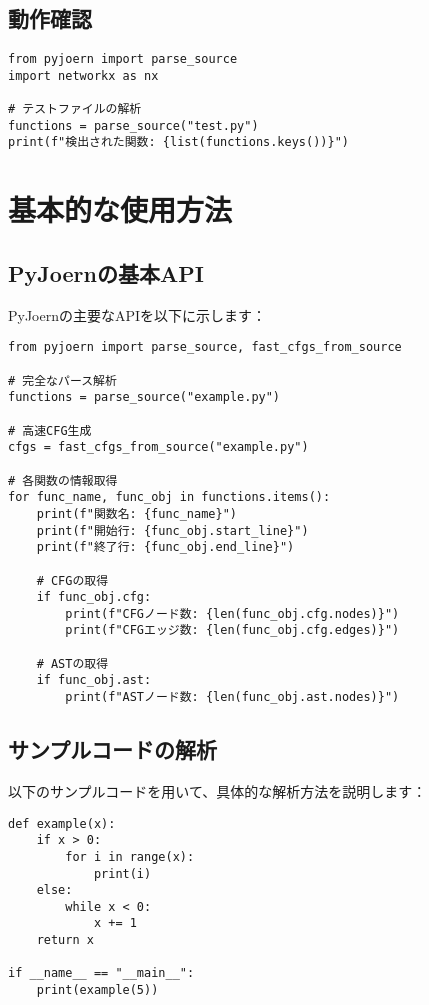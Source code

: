 \documentclass[12pt,a4paper]{article}
\begin{document}
\subsection{動作確認}

\begin{lstlisting}[caption=基本的な動作確認]
from pyjoern import parse_source
import networkx as nx

# テストファイルの解析
functions = parse_source("test.py")
print(f"検出された関数: {list(functions.keys())}")
\end{lstlisting}

\section{基本的な使用方法}

\subsection{PyJoernの基本API}

PyJoernの主要なAPIを以下に示します：

\begin{lstlisting}[caption=PyJoernの基本API]
from pyjoern import parse_source, fast_cfgs_from_source

# 完全なパース解析
functions = parse_source("example.py")

# 高速CFG生成
cfgs = fast_cfgs_from_source("example.py")

# 各関数の情報取得
for func_name, func_obj in functions.items():
    print(f"関数名: {func_name}")
    print(f"開始行: {func_obj.start_line}")
    print(f"終了行: {func_obj.end_line}")

    # CFGの取得
    if func_obj.cfg:
        print(f"CFGノード数: {len(func_obj.cfg.nodes)}")
        print(f"CFGエッジ数: {len(func_obj.cfg.edges)}")

    # ASTの取得
    if func_obj.ast:
        print(f"ASTノード数: {len(func_obj.ast.nodes)}")
\end{lstlisting}

\subsection{サンプルコードの解析}

以下のサンプルコードを用いて、具体的な解析方法を説明します：

\begin{lstlisting}[caption=解析対象のサンプルコード（whiletest.py）]
def example(x):
    if x > 0:
        for i in range(x):
            print(i)
    else:
        while x < 0:
            x += 1
    return x

if __name__ == "__main__":
    print(example(5))
\end{lstlisting}
\end{document}
